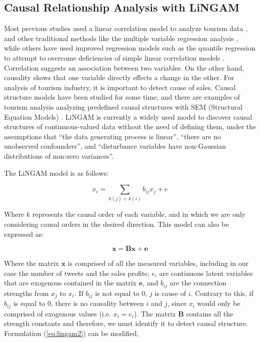 \documentclass[review]{elsarticle}
\renewcommand{\vec}[1]{\mathbf{#1}}
\begin{document}
\subsection{Causal Relationship Analysis with LiNGAM}

Most previous studies used a linear correlation model to analyze tourism data \cite[e.g.][]{deng2007,koberl2016}, and other traditional methods like the multiple variable regression analysis \cite[][]{thomas2017}, while others have used improved regression models such as the quantile regression to attempt to overcome deficiencies of simple linear correlation models \cite[][]{brida2017}. Correlation suggests an association between two variables. On the other hand, causality shows that one variable directly effects a change in the other. For analysis of tourism industry, it is important to detect cause of sales. Causal structure models have been studied for some time, and there are examples of tourism analysis analyzing predefined causal structures with SEM (Structural Equation Models) \cite[][]{pappas2017}. LiNGAM is currently a widely used model to discover causal structures of continuous-valued data without the need of defining them, under the assumptions that “the data generating process is linear”, “there are no unobserved confounders”, and “disturbance variables have non-Gaussian distributions of non-zero variances”.

The LiNGAM model is as follows:

\begin{equation}\label{eq:lingam_long}
x_i = \sum_{k(j)<k(i)} b_{ij}x_{j} + e
\end{equation}

Where \(k\) represents the causal order of each variable, and in which we are only considering causal orders in the desired direction. This model can also be expressed as:

\begin{equation}\label{eq:lingam1}
\vec{x} = \vec{B}\vec{x} + \vec{e}
\end{equation}

Where the matrix \(\vec{x}\) is comprised of all the measured variables, including in our case the number of tweets and the sales profits; \(e_i\) are continuous latent variables that are exogenous contained in the matrix \(\vec{e}\), and \(b_{ij}\) are the connection strengths from \(x_j\) to \(x_i\). If \(b_{ij}\) is not equal to 0, \(j\) is cause of \(i\). Contrary to this, if \(b_{ij}\) is equal to 0, there is no causality between \(i\) and \(j\), since \(x_i\) would only be comprised of exogenous values (i.e. \(x_i = e_i\)). The matrix \(\vec{B}\) contains all the strength constants and therefore, we must identify it to detect causal structure. Formulation (\ref{eq:lingam2}) can be modified,
\end{document}
